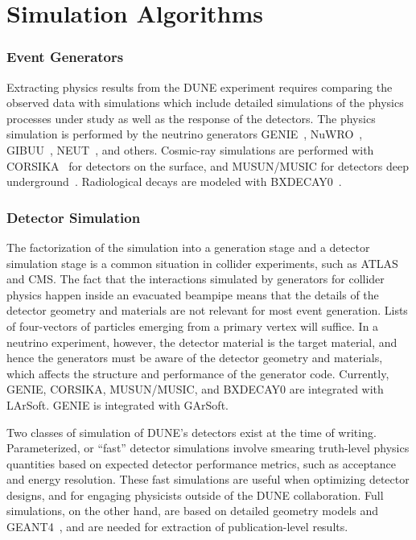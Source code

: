\section{Simulation Algorithms}
\label{sec:algo:sim}

\subsubsection{Event Generators}
\label{sec:eventgen}

Extracting physics results from the DUNE experiment requires comparing the observed data with simulations which include detailed simulations of the physics processes under study as well as the response of the detectors.  The physics simulation is performed by the neutrino generators GENIE~\cite{Andreopoulos:2009rq}, NuWRO~\cite{NuWro2012}, GIBUU~\cite{Gallmeister:2016dnq}, NEUT~\cite{Hayato:2009zz}, and others.  Cosmic-ray simulations are performed with CORSIKA~\cite{Wentz:2003bp,Dembinski:2020wrp} for detectors on the surface, and MUSUN/MUSIC for detectors deep underground~\cite{Kudryavtsev:2008qh,LBNEDOCDB9673}.  Radiological decays are modeled with BXDECAY0~\cite{Ponkratenko:2000um}. 

\subsubsection{Detector Simulation}
\label{sec:detsim}

The factorization of the simulation into a generation stage and a detector simulation stage is a common situation in collider experiments, such as ATLAS and CMS.  The fact that the interactions simulated by generators for collider physics happen inside an evacuated beampipe means that the details of the detector geometry and materials are not relevant for most event generation.  Lists of four-vectors of particles emerging from a primary vertex will suffice.  In a neutrino experiment, however, the detector material is the target material, and hence the generators must be aware of the detector geometry and materials, which affects the structure and performance of the generator code.  Currently, GENIE, CORSIKA, MUSUN/MUSIC, and BXDECAY0 are integrated with LArSoft.  GENIE is integrated with GArSoft.


Two classes of simulation of DUNE's detectors exist at the time of writing.  Parameterized, or ``fast'' detector simulations involve smearing truth-level physics quantities based on expected detector performance metrics, such as acceptance and energy resolution.  These fast simulations are useful when optimizing detector designs, and for engaging physicists outside of the DUNE collaboration.  Full simulations, on the other hand, are based on detailed geometry models and GEANT4~\cite{Agostinelli:2002hh,Allison:2016lfl}, and are needed for extraction of publication-level results.